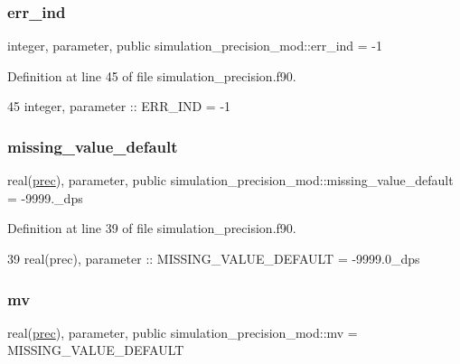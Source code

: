 \subsubsection{\texorpdfstring{err\+\_\+ind}{err\_ind}}
{\footnotesize\ttfamily integer, parameter, public simulation\+\_\+precision\+\_\+mod\+::err\+\_\+ind = -\/1}



Definition at line 45 of file simulation\+\_\+precision.\+f90.


\begin{DoxyCode}
45     \textcolor{keywordtype}{integer},  \textcolor{keywordtype}{parameter}   :: ERR\_IND  = -1
\end{DoxyCode}
\mbox{\label{namespacesimulation__precision__mod_a1fb0f91226452bb43d4c61cae32a9a6d}} 
\subsubsection{\texorpdfstring{missing\+\_\+value\+\_\+default}{missing\_value\_default}}
{\footnotesize\ttfamily real(\mbox{\hyperlink{namespacesimulation__precision__mod_aaff1ddf996761a1e11e787d63e1612f6}{prec}}), parameter, public simulation\+\_\+precision\+\_\+mod\+::missing\+\_\+value\+\_\+default = -\/9999.\+\_\+dps}



Definition at line 39 of file simulation\+\_\+precision.\+f90.


\begin{DoxyCode}
39     \textcolor{keywordtype}{real(prec)}, \textcolor{keywordtype}{parameter} :: MISSING\_VALUE\_DEFAULT = -9999.0\_dps
\end{DoxyCode}
\mbox{\label{namespacesimulation__precision__mod_a39845d8a0d331a7b9225feb5fe19ba3b}} 
\subsubsection{\texorpdfstring{mv}{mv}}
{\footnotesize\ttfamily real(\mbox{\hyperlink{namespacesimulation__precision__mod_aaff1ddf996761a1e11e787d63e1612f6}{prec}}), parameter, public simulation\+\_\+precision\+\_\+mod\+::mv = M\+I\+S\+S\+I\+N\+G\+\_\+\+V\+A\+L\+U\+E\+\_\+\+D\+E\+F\+A\+U\+LT}



